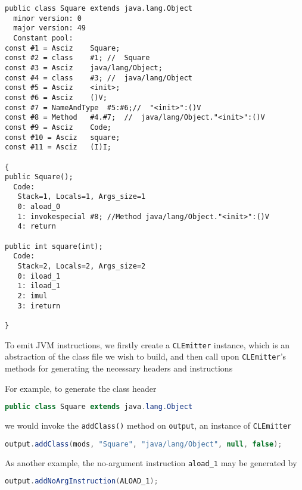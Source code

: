 \documentclass[8pt,a4paper,compress]{beamer}
\begin{document}
\begin{frame}[fragile]
\pause

\begin{lstlisting}[language={}]
public class Square extends java.lang.Object
  minor version: 0
  major version: 49
  Constant pool:
const #1 = Asciz    Square;
const #2 = class    #1; //  Square
const #3 = Asciz    java/lang/Object;
const #4 = class    #3; //  java/lang/Object
const #5 = Asciz    <init>;
const #6 = Asciz    ()V;
const #7 = NameAndType  #5:#6;//  "<init>":()V
const #8 = Method   #4.#7;  //  java/lang/Object."<init>":()V
const #9 = Asciz    Code;
const #10 = Asciz   square;
const #11 = Asciz   (I)I;

{
public Square();
  Code:
   Stack=1, Locals=1, Args_size=1
   0: aload_0
   1: invokespecial #8; //Method java/lang/Object."<init>":()V
   4: return

public int square(int);
  Code:
   Stack=2, Locals=2, Args_size=2
   0: iload_1
   1: iload_1
   2: imul
   3: ireturn

}
\end{lstlisting}
\end{frame}

\begin{frame}[fragile]
\pause

To emit JVM instructions, we firstly create a \lstinline{CLEmitter} instance, which is an abstraction of the class file we wish to build, and then call upon \lstinline{CLEmitter}'s methods for generating the necessary headers and instructions

\pause
\bigskip

For example, to generate the class header
\begin{lstlisting}[language=Java]
public class Square extends java.lang.Object
\end{lstlisting}
we would invoke the \lstinline{addClass()} method on \lstinline{output}, an instance of \lstinline{CLEmitter}
\begin{lstlisting}[language=Java]
output.addClass(mods, "Square", "java/lang/Object", null, false);
\end{lstlisting}

\pause
\bigskip

As another example, the no-argument instruction \lstinline{aload_1} may be generated by
\begin{lstlisting}[language=Java]
output.addNoArgInstruction(ALOAD_1);
\end{lstlisting}
\end{frame}
\end{document}
